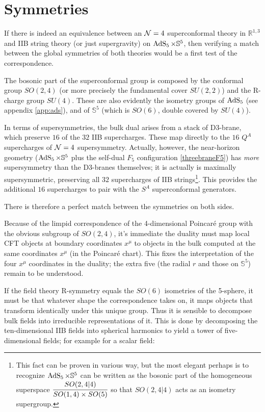 \section{Symmetries}

If there is indeed an equivalence between an $\mathcal{N} = 4$ superconformal theory in $\mathbb{R}^{1,3}$ and IIB string theory (or just supergravity) on $\operatorname{AdS}_{5}\times\mathbb{S}^5$, then verifying a match between the global symmetries of both theories would be a first test of the correspondence.

The bosonic part of the superconformal group is composed by the conformal group $SO(2,4)$ (or more precisely the fundamental cover $SU(2,2)$) and the R-charge group $SU(4)$. These are also evidently the isometry groups of $\operatorname{AdS}_{5}$ (see appendix \ref{app:ads}), and of $\mathbb{S}^5$ (which is $SO(6)$, double covered by $SU(4)$).

In terms of supersymmetries, the bulk dual arises from a stack of D3-brane, which preserve $16$ of the $32$ IIB supercharges. These map directly to the $16$ $Q^A$ supercharges of $\mathcal{N} = 4$ supersymmetry. Actually, however, the near-horizon geometry ($\operatorname{AdS}_{5} \times \mathbb{S}^5$ plus the self-dual $F_5$ configuration \eqref{threebraneF5}) has \emph{more} supersymmetry than the D3-branes themselves; it is actually is maximally supersymmetric, preserving all $32$ supercharges of IIB strings\footnote{This fact can be proven in various way, but the most elegant perhaps is to recognize\cite{METSAEV} $\operatorname{AdS}_{5} \times \mathbb{S}^5$ can be written as the bosonic part of the homogeneous superspace $\cfrac{SO(2,4|4)}{SO(1,4)\times SO(5)}$ so that $SO(2,4|4)$ acts as an isometry supergroup.}. This provides the additional $16$ supercharges to pair with the $S^A$ superconformal generators.

There is therefore a perfect match between the symmetries on both sides.

Because of the limpid correspondence of the 4-dimensional Poincar\'e group with the obvious subgroup of $SO(2,4)$, it's immediate the duality must map local CFT objects at boundary coordinates $x^\mu$ to objects in the bulk computed at the same coordinates $x^\mu$ (in the Poincar\'e chart). This fixes the interpretation of the four $x^\mu$ coordinates in the duality; the extra five (the radial $r$ and those on $\mathbb{S}^5$) remain to be understood.

If the field theory R-symmetry equals the $SO(6)$ isometries of the 5-sphere, it must be that whatever shape the correspondence takes on, it maps objects that transform identically under this unique group. Thus it is sensible to decompose bulk fields into irreducible representations of it\cite{Witten:adshol}. This is done by decomposing the ten-dimensional IIB fields into spherical harmonics to yield a tower of five-dimensional fields; for example for a scalar field:

